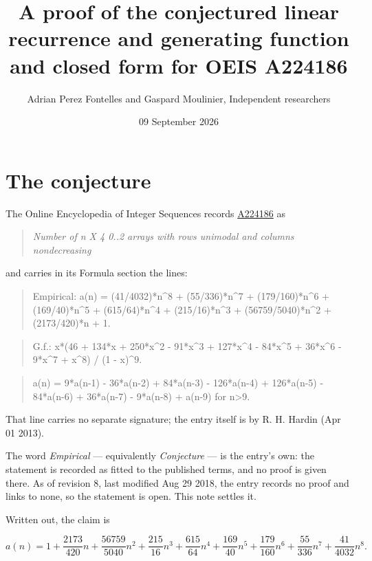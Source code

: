 \documentclass[11pt]{article}
\title{A proof of the conjectured linear recurrence and generating function and closed form for OEIS A224186}
\author{Adrian Perez Fontelles and Gaspard Moulinier, Independent researchers}
\date{09 September 2026}
\theoremstyle{definition}
\begin{document}
\maketitle
\section{The conjecture}

The Online Encyclopedia of Integer Sequences records \href{https://oeis.org/A224186}{A224186} as

\begin{quote}\itshape Number of n X 4 0..2 arrays with rows unimodal and columns nondecreasing\end{quote}

and carries in its Formula section the lines:

\begin{quote}\ttfamily Empirical: a(n) = (41/4032)*n\textasciicircum{}8 + (55/336)*n\textasciicircum{}7 + (179/160)*n\textasciicircum{}6 + (169/40)*n\textasciicircum{}5 + (615/64)*n\textasciicircum{}4 + (215/16)*n\textasciicircum{}3 + (56759/5040)*n\textasciicircum{}2 + (2173/420)*n + 1.\end{quote}

\begin{quote}\ttfamily G.f.: x*(46 + 134*x + 250*x\textasciicircum{}2 - 91*x\textasciicircum{}3 + 127*x\textasciicircum{}4 - 84*x\textasciicircum{}5 + 36*x\textasciicircum{}6 - 9*x\textasciicircum{}7 + x\textasciicircum{}8) / (1 - x)\textasciicircum{}9.\end{quote}

\begin{quote}\ttfamily a(n) = 9*a(n-1) - 36*a(n-2) + 84*a(n-3) - 126*a(n-4) + 126*a(n-5) - 84*a(n-6) + 36*a(n-7) - 9*a(n-8) + a(n-9) for n>9.\end{quote}

That line carries no separate signature; the entry itself is by R. H. Hardin (Apr 01 2013).

The word {\itshape Empirical} --- equivalently {\itshape Conjecture} --- is the entry's own: the statement is recorded as fitted to the published terms, and no proof is given there. As of revision 8, last modified Aug 29 2018, the entry records no proof and links to none, so the statement is open. This note settles it.

Written out, the claim is

\[a(n) = 1 + \frac{2173}{420}n + \frac{56759}{5040}n^{2} + \frac{215}{16}n^{3} + \frac{615}{64}n^{4} + \frac{169}{40}n^{5} + \frac{179}{160}n^{6} + \frac{55}{336}n^{7} + \frac{41}{4032}n^{8}.\]
\end{document}
